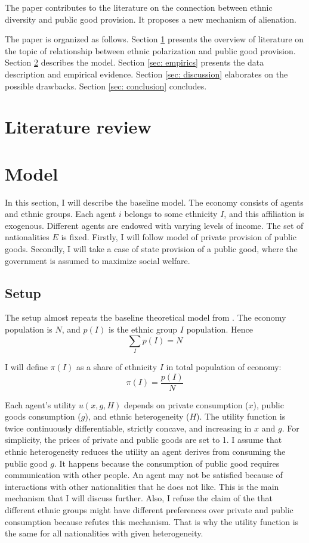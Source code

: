 \documentclass[12pt]{article}
\begin{document}
The paper contributes to the literature on the connection between ethnic diversity and public good provision. It proposes a new mechanism of alienation. 

The paper is organized as follows. Section \ref{sec: literature} presents the overview of literature on the topic of relationship between ethnic polarization and public good provision. Section \ref{sec: model} describes the model. Section \ref{sec: empirics} presents the data description and empirical evidence. Section \ref{sec: discussion} elaborates on the possible drawbacks. Section \ref{sec: conclusion} concludes. 


\section{Literature review}
\label{sec: literature}



\section{Model}
\label{sec: model}

In this section, I will describe the baseline model. The economy consists of agents and ethnic groups. Each agent $i$ belongs to some ethnicity $I$, and this affiliation is exogenous. Different agents are endowed with varying levels of income. The set of nationalities $E$ is fixed. Firstly, I will follow \cite{BBV} model of private provision of public goods. Secondly, I will take a case of state provision of a public good, where the government is assumed to maximize social welfare.

\subsection{Setup}

The setup almost repeats the baseline theoretical model from \cite{BreakUp}. The economy population is $N$, and $p(I)$ is the ethnic group $I$ population. Hence
\[
    \sum_{I}p(I) = N
\]

I will define $\pi(I)$ as a share of ethnicity $I$  in total population of economy:
\[ \pi(I) = \frac{p(I)}{N} \]

Each agent's utility $u(x, g, H)$ depends on private consumption ($x$), public goods consumption ($g$), and ethnic heterogeneity ($H$). The utility function is twice continuously differentiable, strictly concave, and increasing in $x$ and $g$. For simplicity, the prices of private and public goods are set to 1. I assume that ethnic heterogeneity reduces the utility an agent derives from consuming the public good $g$. It happens because the consumption of public good requires communication with other people. An agent may not be satisfied because of interactions with other nationalities that he does not like. This is the main mechanism that I will discuss further. Also, I refuse the claim of the \cite{AlesinaDivision} that different ethnic groups might have different preferences over private and public consumption because \cite{WhyUndermine} refutes this mechanism. That is why the utility function is the same for all nationalities with given heterogeneity. 
\end{document}
